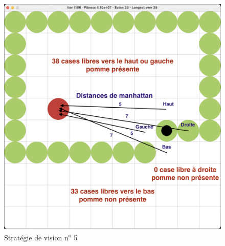 \documentclass[10pt]{beamer}
\begin{document}
\begin{frame}
\begin{columns}[T]
\begin{column}{0.40\textwidth}
\begin{figure}
\vspace{-0.8cm}
\includegraphics[width=1\textwidth]{snake_vision_illustration.png}
\vspace{-0.7cm}
\caption*{\tiny Stratégie de vision n\textsuperscript{o} 5}
\end{figure}

\end{column}
\end{columns}
\end{frame}
\end{document}
